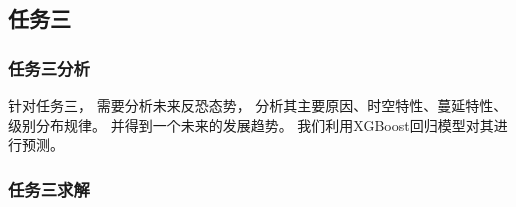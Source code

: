 \documentclass[bwprint]{gmcmthesis}
\begin{document}
\subsection{任务三}

\subsubsection{任务三分析}

针对任务三，
需要分析未来反恐态势，
分析其主要原因、时空特性、蔓延特性、级别分布规律。
并得到一个未来的发展趋势。
我们利用XGBoost回归模型对其进行预测。

\subsubsection{任务三求解}
\end{document}
